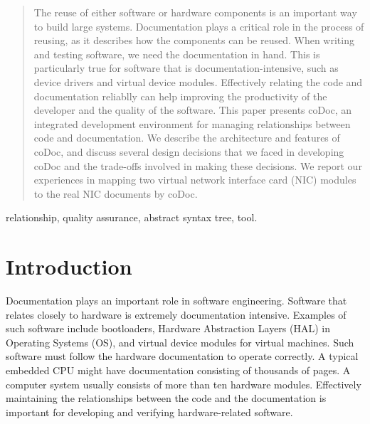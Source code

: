 \documentclass[conference]{IEEEtran}
\begin{document}
\begin{abstract}
The reuse of either software or hardware components is an important way to build large systems.
Documentation plays a critical role in the process of reusing,
as it describes how the components can be reused.
When writing and testing software, 
we need the documentation in hand.
This is particularly true for software that is documentation-intensive, 
such as device drivers and virtual device modules.
Effectively relating the code and documentation reliablly can help improving the productivity of the developer and the quality of the software.
This paper presents coDoc, 
an integrated development environment for managing relationships between code and documentation.
We describe the architecture and features of coDoc,
and discuss several design decisions that we faced in developing coDoc and the trade-offs involved in making these decisions.
We report our experiences in mapping two virtual network interface card (NIC) modules to the real NIC documents by coDoc.
\end{abstract}

\begin{IEEEkeywords}
relationship, quality assurance, abstract syntax tree, tool.
\end{IEEEkeywords}




%
\IEEEpeerreviewmaketitle



\section{Introduction}
\label{sec:introduction}
Documentation plays an important role in software engineering.
Software that relates closely to hardware is extremely documentation intensive. %
Examples of such software include bootloaders, 
Hardware Abstraction Layers (HAL) in Operating Systems (OS),
and virtual device modules for virtual machines.
Such software must follow the hardware documentation to operate correctly.
A typical embedded CPU might have documentation consisting of thousands of pages.
A computer system usually consists of more than ten hardware modules.
Effectively maintaining the relationships between the code and the documentation is important for developing and verifying hardware-related software.
\end{document}
